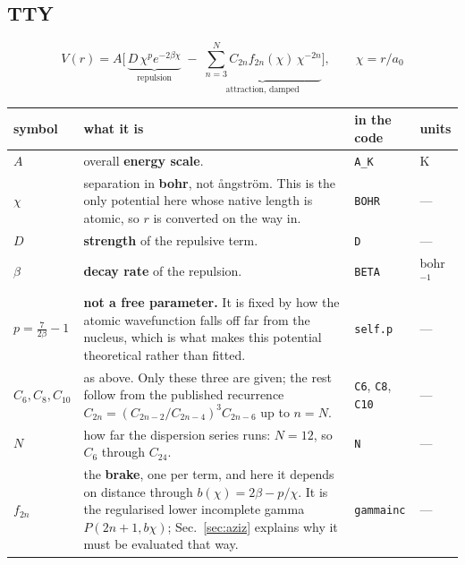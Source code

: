 \documentclass[11pt,a4paper]{article}
\begin{document}
\subsection{TTY}

\[
  V(r) = A\bigl[\,\underbrace{D\,\chi^{p}e^{-2\beta \chi}}_{\text{repulsion}}
  \;-\;\underbrace{\textstyle\sum_{n=3}^{N} C_{2n}f_{2n}(\chi)\,\chi^{-2n}}_{\text{attraction, damped}}\bigr],
  \qquad \chi = r/a_0
\]

\begin{center}
\small
\begin{tabular}{@{}l@{\hspace{4pt}}p{8.0cm}@{\hspace{4pt}}l@{\hspace{4pt}}l@{}}
\toprule
symbol & what it is & in the code & units \\
\midrule
$A$ & overall \textbf{energy scale}. & \texttt{A\_K} & K \\
$\chi$ & separation in \textbf{bohr}, not \aa ngstr\"om. This is the only
      potential here whose native length is atomic, so $r$ is converted on the
      way in. & \texttt{BOHR} & --- \\
$D$ & \textbf{strength} of the repulsive term. & \texttt{D} & --- \\
$\beta$ & \textbf{decay rate} of the repulsion. & \texttt{BETA} & bohr$^{-1}$ \\
$p=\frac{7}{2\beta}-1$ & \textbf{not a free parameter.} It is fixed by how the
      atomic wavefunction falls off far from the nucleus, which is what makes
      this potential theoretical rather than fitted.
      & \texttt{self.p} & --- \\
$C_6,C_8,C_{10}$ & as above. Only these three are given; the rest follow from
      the published recurrence $C_{2n}=(C_{2n-2}/C_{2n-4})^3C_{2n-6}$ up to
      $n=N$. & \texttt{C6}, \texttt{C8}, \texttt{C10} & --- \\
$N$ & how far the dispersion series runs: $N=12$, so $C_6$ through $C_{24}$.
      & \texttt{N} & --- \\
$f_{2n}$ & the \textbf{brake}, one per term, and here it depends on distance
      through $b(\chi)=2\beta-p/\chi$. It is the regularised lower incomplete
      gamma $P(2n+1,b\chi)$; Sec.~\ref{sec:aziz} explains why it must be
      evaluated that way. & \texttt{gammainc} & --- \\
\bottomrule
\end{tabular}
\end{center}
\end{document}
